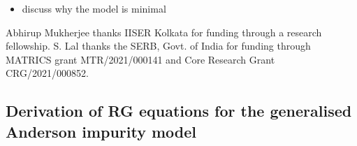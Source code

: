 \documentclass[reprint,superscriptaddress,floatfix]{revtex4-2}
\begin{document}
\begin{itemize}
	\item discuss why the model is minimal
\end{itemize}

\acknowledgments
Abhirup Mukherjee thanks IISER Kolkata for funding through a research fellowship. S. Lal thanks the SERB, Govt. of India for funding through MATRICS grant MTR/2021/000141 and Core Research Grant CRG/2021/000852.



\appendix*

\begin{widetext}
\section{Derivation of RG equations for the generalised Anderson impurity model}


\end{widetext}
\end{document}
